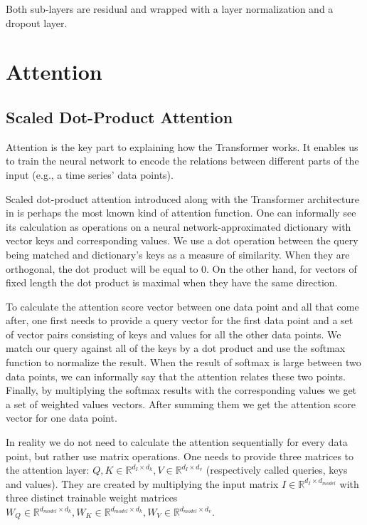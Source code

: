 \documentclass[en]{pracamgr}
\begin{document}
	Both sub-layers are residual and wrapped with a layer normalization and a dropout layer.
	
	\section{Attention}
	
	\subsection{Scaled Dot-Product Attention}
	
	Attention is the key part to explaining how the Transformer works.
	It enables us to train the neural network to encode the relations between different parts of the input (e.g., a time series' data points).
	
	Scaled dot-product attention introduced along with the Transformer architecture in \cite{tr} is perhaps the most known kind of attention function.
	One can informally see its calculation as operations on a neural network-approximated dictionary with vector keys and corresponding values. We use a dot operation between the query being matched and dictionary's keys as a measure of similarity. When they are orthogonal, the dot product will be equal to 0. On the other hand, for vectors of fixed length the dot product is maximal when they have the same direction.

	To calculate the attention score vector between one data point and all that come after, one first needs to provide a query vector for the first data point and a set of vector pairs consisting of keys and values for all the other data points. We match our query against all of the keys by a dot product and use the softmax function to normalize the result. When the result of softmax is large between two data points, we can informally say that the attention relates these two points. 
	Finally, by multiplying the softmax results with the corresponding values we get a set of weighted values vectors. After summing them we get the attention score vector for one data point.
	\newline
	
	In reality we do not need to calculate the attention sequentially for every data point, but rather use matrix operations.
	One needs to provide three matrices to the attention layer: $Q, K \in \mathbb{R}^{d_I \times d_k}, V \in \mathbb{R}^{d_I \times d_v}$ (respectively called queries, keys and values). They are created by multiplying the input matrix $I \in \mathbb{R}^{d_I \times d_{model}}$ with three distinct trainable weight matrices $W_Q \in \mathbb{R}^{d_{model} \times d_k}, W_K \in \mathbb{R}^{d_{model} \times d_k}, W_V \in \mathbb{R}^{d_{model} \times d_v}$.
	
\end{document}

